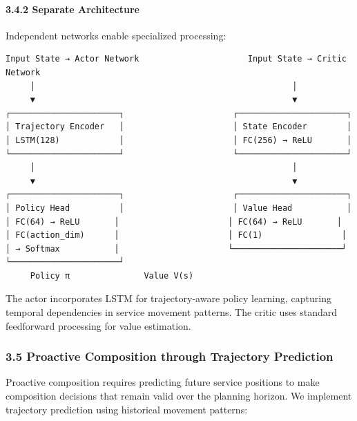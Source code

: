 \documentclass[
  10pt,
  twocolumn,
]{article}
\begin{document}
\hypertarget{separate-architecture}{%
	\paragraph{3.4.2 Separate Architecture}\label{separate-architecture}}

Independent networks enable specialized processing:

\begin{verbatim}
Input State → Actor Network                      Input State → Critic Network
     │                                                    │
     ▼                                                    ▼
┌──────────────────────┐                      ┌──────────────────────┐
│ Trajectory Encoder   │                      │ State Encoder        │
│ LSTM(128)            │                      │ FC(256) → ReLU       │
└──────────────────────┘                      └──────────────────────┘
     │                                                    │
     ▼                                                    ▼
┌──────────────────────┐                      ┌──────────────────────┐
│ Policy Head          │                      │ Value Head           │
│ FC(64) → ReLU       │                      │ FC(64) → ReLU       │
│ FC(action_dim)      │                      │ FC(1)                │
│ → Softmax           │                      └──────────────────────┘
└──────────────────────┘
     Policy π               Value V(s)
\end{verbatim}

The actor incorporates LSTM for trajectory-aware policy learning,
capturing temporal dependencies in service movement patterns. The critic
uses standard feedforward processing for value estimation.

\hypertarget{proactive-composition-through-trajectory-prediction}{%
	\subsubsection{3.5 Proactive Composition through Trajectory
		Prediction}\label{proactive-composition-through-trajectory-prediction}}

Proactive composition requires predicting future service positions to
make composition decisions that remain valid over the planning horizon.
We implement trajectory prediction using historical movement patterns:
\end{document}
